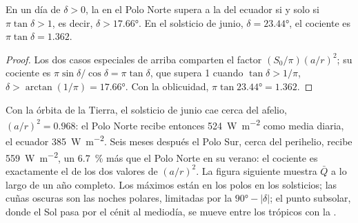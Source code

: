 \begin{proposition}\label{prop:b1:radiation-heat-transport:polar-summer}
En un día de  $\delta > 0$, la  en el Polo Norte
supera a la del ecuador si y solo si $\pi\tan\delta > 1$, es decir, $\delta >
\ang{17.66}$. En el solsticio de junio, $\delta = \ang{23.44}$, el cociente es $\pi\tan
\delta = 1.362$.
\end{proposition}

\begin{proof}
Los dos casos especiales de arriba comparten el factor $(S_0/\pi)(a/r)^2$; su cociente es
$\pi\sin\delta/\cos\delta = \pi\tan\delta$, que supera 1 cuando $\tan\delta >
1/\pi$, $\delta > \arctan(1/\pi) = \ang{17.66}$. Con la oblicuidad,
$\pi\tan\ang{23.44} = 1.362$.
\end{proof}

Con la órbita de la Tierra, el solsticio de junio cae cerca del afelio, $(a/r)^2 = 0.968$:
el Polo Norte recibe entonces \qty{524}{W.m^{-2}} como media diaria, el ecuador
\qty{385}{W.m^{-2}}. Seis meses después el Polo Sur, cerca del perihelio, recibe
\qty{559}{W.m^{-2}}, un \qty{6.7}{\percent} más que el Polo Norte en su verano: el cociente es exactamente el de los dos valores de $(a/r)^2$. La figura siguiente
muestra $\bar Q$ a lo largo de un año completo. Los máximos están en los polos en los solsticios;
las cuñas oscuras son las noches polares, limitadas por la  $\ang{90} -
|\delta|$; el punto subsolar, donde el Sol pasa por el cénit al mediodía, se mueve entre los trópicos con la .

